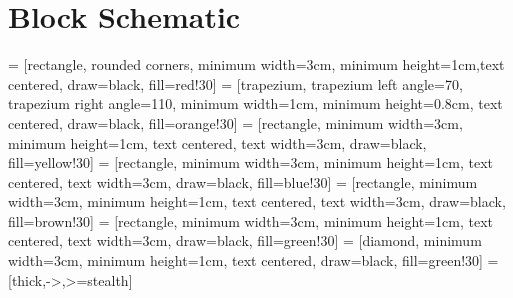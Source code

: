 \documentclass[12pt]{article}
\begin{document}
\clearpage


\section{Block Schematic}

\thispagestyle{empty}
 = [rectangle, rounded corners, minimum width=3cm, minimum height=1cm,text centered, draw=black, fill=red!30]
 = [trapezium, trapezium left angle=70, trapezium right angle=110, minimum width=1cm, minimum height=0.8cm, text centered, draw=black, fill=orange!30]
 = [rectangle, minimum width=3cm, minimum height=1cm, text centered, text width=3cm, draw=black, fill=yellow!30]
 = [rectangle, minimum width=3cm, minimum height=1cm, text centered, text width=3cm, draw=black, fill=blue!30]
 = [rectangle, minimum width=3cm, minimum height=1cm, text centered, text width=3cm, draw=black, fill=brown!30]
 = [rectangle, minimum width=3cm, minimum height=1cm, text centered, text width=3cm, draw=black, fill=green!30]
 = [diamond, minimum width=3cm, minimum height=1cm, text centered, draw=black, fill=green!30]
 = [thick,->,>=stealth]
\end{document}
